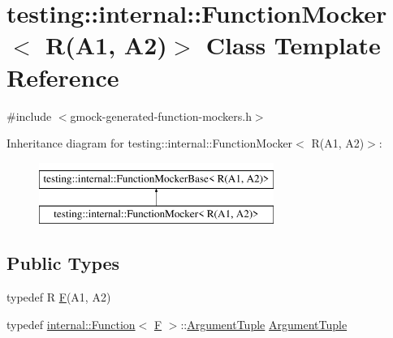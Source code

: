 \hypertarget{classtesting_1_1internal_1_1FunctionMocker_3_01R_07A1_00_01A2_08_4}{}\section{testing\+::internal\+::Function\+Mocker$<$ R(A1, A2)$>$ Class Template Reference}
\label{classtesting_1_1internal_1_1FunctionMocker_3_01R_07A1_00_01A2_08_4}


{\ttfamily \#include $<$gmock-\/generated-\/function-\/mockers.\+h$>$}

Inheritance diagram for testing\+::internal\+::Function\+Mocker$<$ R(A1, A2)$>$\+:\begin{figure}[H]
\begin{center}
\leavevmode
\includegraphics[height=2.000000cm]{classtesting_1_1internal_1_1FunctionMocker_3_01R_07A1_00_01A2_08_4}
\end{center}
\end{figure}
\subsection*{Public Types}
\begin{DoxyCompactItemize}
\item 
typedef R \mbox{\hyperlink{classtesting_1_1internal_1_1FunctionMocker_3_01R_07A1_00_01A2_08_4_a61302610bfc9b30588ea345e468310b2}{F}}(A1, A2)
\item 
typedef \mbox{\hyperlink{structtesting_1_1internal_1_1Function}{internal\+::\+Function}}$<$ \mbox{\hyperlink{classtesting_1_1internal_1_1FunctionMocker_3_01R_07A1_00_01A2_08_4_a61302610bfc9b30588ea345e468310b2}{F}} $>$\+::\mbox{\hyperlink{classtesting_1_1internal_1_1FunctionMocker_3_01R_07A1_00_01A2_08_4_ae75e3ba40a99224f7363681914212c19}{Argument\+Tuple}} \mbox{\hyperlink{classtesting_1_1internal_1_1FunctionMocker_3_01R_07A1_00_01A2_08_4_ae75e3ba40a99224f7363681914212c19}{Argument\+Tuple}}
\end{DoxyCompactItemize}
